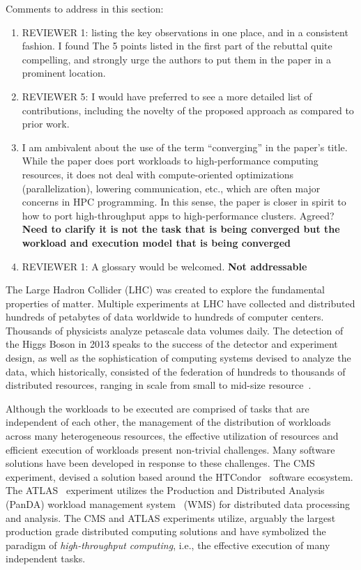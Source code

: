 \ifreview
Comments to address in this section:
\begin{enumerate}
	\item REVIEWER 1: listing the key observations in one place, and in a
	consistent fashion. I found The 5 points listed in the first part of the
	rebuttal quite compelling, and strongly urge the authors to put them in
	the paper in a prominent location.
	\item REVIEWER 5: I would have preferred to see a more detailed list of
	contributions, including the novelty of the proposed approach as compared
	to prior work.
	\item I am ambivalent about the use of the term ``converging'' in the
	paper's title. While the paper does port workloads to high-performance
	computing resources, it does not deal with compute-oriented optimizations
	(parallelization), lowering communication, etc., which are often major
	concerns in HPC programming. In this sense, the paper is closer in spirit
	to how to port high-throughput apps to high-performance clusters. Agreed?
	{\bf  Need to clarify it is not the task that is being converged but the workload and execution model that is being converged}
	\item REVIEWER 1: A glossary would be welcomed. {\bf Not addressable}
\end{enumerate}
\fi

The Large Hadron Collider (LHC) was created to explore the fundamental
properties of matter. Multiple experiments at LHC have collected and
distributed hundreds of petabytes of data worldwide to hundreds of computer
centers. Thousands of physicists analyze petascale data volumes daily. The
detection of the Higgs Boson in 2013 speaks to the success of the detector and
experiment design, as well as the sophistication of computing systems devised
to analyze the data, which historically, consisted of the federation of
hundreds to thousands of distributed resources, ranging in
scale from small to mid-size resource~\cite{foster2003grid}.

Although the workloads to be executed are comprised of tasks that are
independent of each other, the management of the distribution of workloads
across many heterogeneous resources, the effective utilization of resources
and efficient execution of workloads present non-trivial challenges. Many
software solutions have been developed in response to these challenges. The
CMS experiment, devised a solution based around the
HTCondor~\cite{thain2005distributed} software ecosystem. The
ATLAS~\cite{Aad:2008} experiment utilizes the Production and Distributed
Analysis (PanDA) workload management system~\cite{Maeno2011} (WMS) for
distributed data processing and analysis. The CMS and ATLAS experiments
utilize, arguably the largest production grade distributed computing
solutions and have symbolized the paradigm of {\it high-throughput computing},
i.e., the effective execution of many independent tasks.

